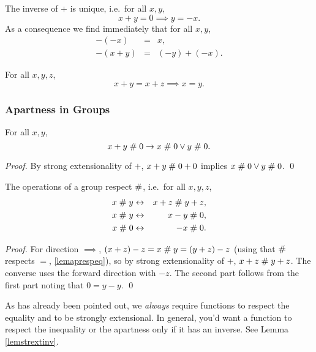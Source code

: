 \begin{lemma}\label{lemuninv}
The inverse of $+$ is unique, i.e.\ for all $x,y$,
$$x + y = 0  \implies y = -x.$$
As a consequence we find immediately that for all $x,y$,
\begin{eqnarray*}
  -(-x) &=& x,\\
  -(x+y) &=& (-y)+(-x).
\end{eqnarray*}
\end{lemma}

\begin{lemma}[Cancellation]\label{lemcanc} For all $x, y, z$,
\[
x+y=x+z \implies x=y.
\]
\end{lemma}

\subsubsection{Apartness in Groups}

\begin{lemma}\label{lemGrpHeyt}
For all $x,y$,
\[ x+y\mathrel{\#} 0 \rightarrow x\mathrel{\#} 0 \vee y\mathrel{\#} 0. \]
\end{lemma}
\begin{proof}
By strong extensionality of $+$,  
$x+y\mathrel{\#} 0+0$ implies $x\mathrel{\#} 0\vee y\mathrel{\#} 0$.
\qed
\end{proof}

\begin{lemma}\label{lemgrstrext}
The operations of a group respect $\mathrel{\#}$, i.e.\ for all $x,y,z$,
\begin{eqnarray*}
x\mathrel{\#} y & \leftrightarrow & x+z \mathrel{\#} y+z,\\
x\mathrel{\#} y & \leftrightarrow & x-y \mathrel{\#} 0,\\
x\mathrel{\#} 0 & \leftrightarrow & -x \mathrel{\#} 0.
\end{eqnarray*}
\end{lemma}
\begin{proof}
For direction $\implies$, $(x+z)-z = x\mathrel{\#} y = (y+z)-z$
(using that $\mathrel{\#}$ respects $=$, \ref{lemaprespeq}), so by strong
extensionality of $+$, $x+z\mathrel{\#} y+z$. The converse uses the forward
direction with $-z$. The second part follows from the first part
noting that $0=y-y$. \qed
\end{proof}

\begin{remark}As has already been pointed out, we {\em always} require 
functions to respect the equality and to be strongly extensional.
In general, you'd want a function to respect the inequality or the
apartness only if it has an inverse. See Lemma \ref{lemstrextinv}.
\end{remark}
